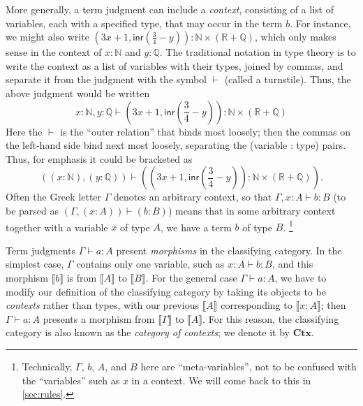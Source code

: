 \documentclass[10pt]{article}
\def\m#1{\llbracket#1\rrbracket}
\def\N{\mathbb{N}}
\def\Q{\mathbb{Q}}
\def\R{\mathbb{R}}
\def\types{\vdash}
\def\Ctx{\mathbf{Ctx}}
\numberwithin{equation}{section}
\begin{document}
More generally, a term judgment can include a \emph{context}, consisting of a list of variables, each with a specified type, that may occur in the term $b$.
For instance, we might also write $(3x+1, \mathsf{inr}(\frac{3}{4}-y)) : \N\times (\R+\Q)$, which only makes sense in the context of $x:\N$ and $y:\Q$.
The traditional notation in type theory is to write the context as a list of variables with their types, joined by commas, and separate it from the judgment with the symbol $\types$ (called a turnstile).
Thus, the above judgment would be written
\[ x:\N, y:\Q \types (3x+1, \mathsf{inr}(\textstyle\frac{3}{4}-y)) : \N\times (\R+\Q) \]
Here the $\types$ is the ``outer relation'' that binds most loosely; then the commas on the left-hand side bind next most loosely, separating the (variable : type) pairs.
Thus, for emphasis it could be bracketed as
\[ ((x:\N), (y:\Q)) \types ((3x+1, \mathsf{inr}(\textstyle\frac{3}{4}-y)) : \N\times (\R+\Q)). \]
Often the Greek letter $\Gamma$ denotes an arbitrary context, so that $\Gamma, x:A \types b:B$ (to be parsed as $(\Gamma, (x:A)) \types (b:B)$) means that in some arbitrary context together with a variable $x$ of type $A$, we have a term $b$ of type $B$.%
\footnote{Technically, $\Gamma$, $b$, $A$, and $B$ here are ``meta-variables'', not to be confused with the ``variables'' such as $x$ in a context.  We will come back to this in \cref{sec:rules}.}

Term judgments $\Gamma \types a:A$ present \emph{morphisms} in the classifying category.
In the simplest case, $\Gamma$ contains only one variable, such as $x:A \types b:B$, and this morphism $\m b$ is from $\m A$ to $\m B$.
For the general case $\Gamma \types a:A$, we have to modify our definition of the classifying category by taking its objects to be \emph{contexts} rather than types, with our previous $\m A$ corresponding to $\m{x:A}$; then %
$\Gamma \types a:A$ presents a morphism from $\m \Gamma$ to $\m{A}$.
For this reason, the classifying category is also known as the \emph{category of contexts}; we denote it by $\Ctx$.
\end{document}
